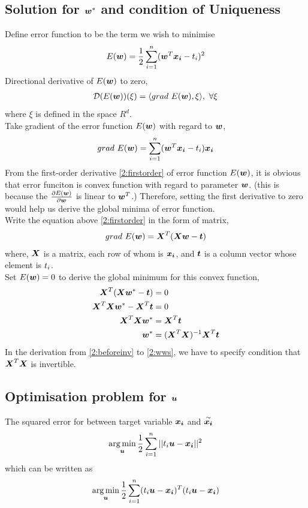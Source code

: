 \documentclass[11pt,a4paper]{article}
\newcommand{\htab}{\hspace*{0.63cm}}
\newcommand{\D}{\mathcal{D}}
\newcommand{\half}{\frac{1}{2}}
\DeclareMathOperator*{\argmin}{arg\,min}
\begin{document}
\subsection{Solution for $\boldsymbol{w}^{*}$ and condition of Uniqueness}
\htab Define error function to be the term we wish to minimise
    \begin{align}
    E(\ww)  =  \half \sum_{i=1}^{n} (\wwt \xxi - \tti)^{2}
    \end{align}
\htab Directional derivative of $E(\boldsymbol{w})$ to zero,
\begin{align}
    \D (E(\ww)) (\xi) = \langle grad\ E(\ww), \xi \rangle,\ \forall \xi
    \end{align}
\htab where $\xi$ is defined in the space $R^{d}$. \\
\htab Take gradient of the error function $E(\boldsymbol{w})$ with regard to $\boldsymbol{w}$,
\begin{align} \label{2:firstorder}
    grad\ E(\boldsymbol{w}) =  \sum_{i=1}^{n} (\boldsymbol{w}^{T} \boldsymbol{x_{i}} - t_{i})\boldsymbol{x_{i}}
    \end{align}
\htab From the first-order derivative \eqref{2:firstorder} of error function $E(\boldsymbol{w})$, it is obvious that error funciton is convex function with regard to parameter $\boldsymbol{w}$. (this is because the $\frac{\partial E(\boldsymbol{w})}{\partial \boldsymbol{w}}$ is linear to $\boldsymbol{w}^{T}$.) Therefore, setting the first derivative to zero would help us derive the global minima of error function. \\[0.1cm]
\htab Write the equation above \eqref{2:firstorder} in the form of matrix, 
    \begin{align}
        grad\ E(\boldsymbol{w}) = \boldsymbol{X}^{T} (\boldsymbol{X} \boldsymbol{w} - \boldsymbol{t})
    \end{align}
\htab where, $\boldsymbol{X}$ is a matrix, each row of whom is $\boldsymbol{x_{i}}$, and $\boldsymbol{t}$ is a column 
vector whose element is $t_{i}$. \\[0.1cm]
\htab Set $E(\boldsymbol{w}) = 0$ to derive the global minimum for this convex function,
    \begin{align}
        \boldsymbol{X}^{T} (\boldsymbol{X} \boldsymbol{w}^{*} - \boldsymbol{t}) &= 0 \\
        \boldsymbol{X}^{T} \boldsymbol{X} \boldsymbol{w}^{*} - \boldsymbol{X}^{T} \boldsymbol{t} &= 0 \\
        \boldsymbol{X}^{T} \boldsymbol{X} \boldsymbol{w}^{*} &= \boldsymbol{X}^{T} \boldsymbol{t} \label{2:beforeinv} \\
        \boldsymbol{w}^{*} &= (\boldsymbol{X}^{T} \boldsymbol{X})^{-1} \boldsymbol{X}^{T} \boldsymbol{t} \label{2:wws}
    \end{align}
\htab In the derivation from \eqref{2:beforeinv} to \eqref{2:wws}, we have to 
    specify condition that $\boldsymbol{X}^{T} \boldsymbol{X}$ is invertible. 
\newpage
\subsection{Optimisation problem for $\boldsymbol{u}$}
\htab The squared error for between target variable $\boldsymbol{x_{i}}$ and $\overset{\sim}{\boldsymbol{x_{i}}} $
    \begin{align}
        \argmin_{\uu} \half \sum_{i=1}^{n} ||\tti \uu - \xxi||^{2}
    \end{align}
\htab which can be written as 
    \begin{align}
        \argmin_{\uu} \half \sum_{i=1}^{n} (\tti \uu - \xxi)^{T} (\tti \uu - \xxi)
    \end{align}
\end{document}
